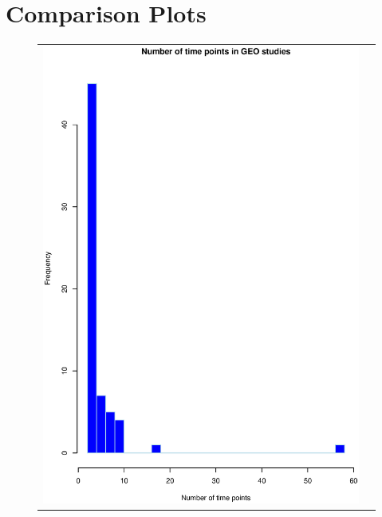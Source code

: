 \documentclass[a4paper]{article}
\date{}
\begin{document}
\section{Comparison Plots}

\begin{figure}[h!]
\centering
\begin{tabular}{cc}
\includegraphics[scale=0.3]{GEOtime.eps}&

\end{tabular}
\end{figure}
\end{document}
